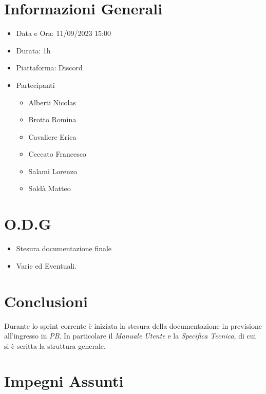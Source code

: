 \documentclass[a4paper, 12pt]{article}
\begin{document}
\makefrontpage

\section*{Informazioni Generali}
\begin{itemize}
    \item Data e Ora: 11/09/2023 15:00
    \item Durata: 1h
    \item Piattaforma: Discord
    \item Partecipanti
    \begin{itemize}
        \item Alberti Nicolas
        \item Brotto Romina
        \item Cavaliere Erica
        \item Ceccato Francesco
        \item Salami Lorenzo
        \item Soldà Matteo
    \end{itemize}
\end{itemize}

\section*{O.D.G}
\begin{itemize}
    \item Stesura documentazione finale
    \item Varie ed Eventuali.
\end{itemize}

\section*{Conclusioni}
Durante lo sprint corrente è iniziata la stesura della documentazione in previsione all'ingresso in \textit{PB}. 
In particolare il \textit{Manuale Utente} e la \textit{Specifica Tecnica}, di cui si è scritta la struttura generale.



\section*{Impegni Assunti}
\end{document}
